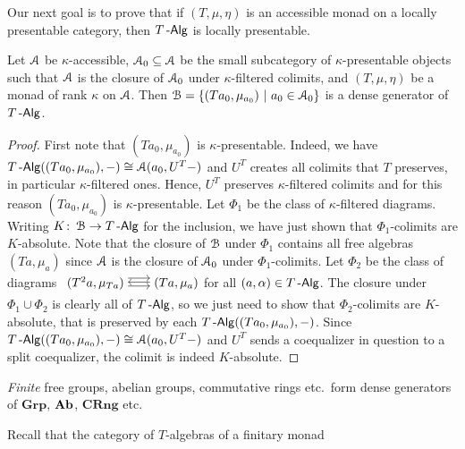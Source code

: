 \documentclass[a4paper,11pt,oneside,openany]{scrbook}
\begin{document}
Our next goal is to prove that if $(T,\mu,\eta)$ is an accessible monad on a
locally presentable category, then $T\operatorname{-\mathsf{Alg}}$ is locally presentable.
\begin{prop}
	Let $\operatorname{\mathcal{A}}$ be $\kappa$-accessible, $\operatorname{\mathcal{A}}_0\subseteq\operatorname{\mathcal{A}}$ be the small subcategory
    of $\kappa$-presentable objects such that $\operatorname{\mathcal{A}}$ is the closure of $\operatorname{\mathcal{A}}_0$
    under $\kappa$-filtered colimits, and $(T,\mu,\eta)$ be a monad of rank
    $\kappa$ on $\operatorname{\mathcal{A}}$. Then $\operatorname{\mathcal{B}}=\{ (Ta_0,\mu_{a_0})\ | \ a_0\in\operatorname{\mathcal{A}}_0 \}$ is a
    dense generator of $T\operatorname{-\mathsf{Alg}}$.
\end{prop}
\begin{proof}
	First note that $(Ta_0,\mu_{a_0})$ is $\kappa$-presentable. Indeed, we have
    $T\operatorname{-\mathsf{Alg}}((Ta_0,\mu_{a_0}),-)\cong\operatorname{\mathcal{A}}(a_0,U^T-)$ and $U^T$ creates all colimits
    that $T$ preserves, in particular $\kappa$-filtered ones. Hence, $U^T$
    preserves $\kappa$-filtered colimits and for this reason $(Ta_0,\mu_{a_0})$
    is $\kappa$-presentable. Let $\Phi_1$  be the class of $\kappa$-filtered
    diagrams. Writing $K\colon\operatorname{\mathcal{B}}\to T\operatorname{-\mathsf{Alg}}$ for the inclusion, we have just shown
    that $\Phi_1$-colimits are $K$-absolute. Note that the closure of $\operatorname{\mathcal{B}}$ under
    $\Phi_1$ contains all free algebras $(Ta,\mu_a)$ since $\operatorname{\mathcal{A}}$ is the closure
    of $\operatorname{\mathcal{A}}_0$ under $\Phi_1$-colimits. Let $\Phi_2$ be the class of diagrams
    $\begin{tikzcd}
	        (T^2a,\mu_{Ta})\hspace{-1.5mm}\arrow[r, shift right=.5ex, shorten <= .3em, shorten >= .3em]  \arrow[r, shift left=1ex, shorten <= .3em, shorten >= .3em] & \hspace{-1.5mm}(Ta,\mu_a)\arrow[l, shift right=.25ex, shorten <=.3em, shorten >=.3em]
		\end{tikzcd}\hspace{-1.5mm}$ for all $(a,\alpha)\in T\operatorname{-\mathsf{Alg}}$. The closure
        under $\Phi_1\cup\Phi_2$ is clearly all of $T\operatorname{-\mathsf{Alg}}$, so we just need to
        show that $\Phi_2$-colimits are $K$-absolute, that is preserved by each
        $T\operatorname{-\mathsf{Alg}}((Ta_0,\mu_{a_0}),-)$. Since
        $T\operatorname{-\mathsf{Alg}}((Ta_0,\mu_{a_0}),-)\cong\operatorname{\mathcal{A}}(a_0, U^T-)$ and $U^T$ sends a
        coequalizer in question to a split coequalizer, the colimit is indeed
        $K$-absolute.
\end{proof}
\begin{exmp}
	\emph{Finite} free groups, abelian groups, commutative rings etc.\ form
    dense generators of $\mathbf{Grp}$, ${\normalfont\textbf{Ab}}$, $\mathbf{CRng}$ etc.
\end{exmp}
Recall that the category of $T$-algebras of a finitary monad
\end{document}
